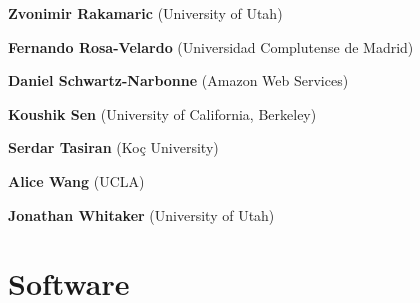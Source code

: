 \documentclass{article}
\begin{document}
\begin{commalist}
    \item {\bf Zvonimir Rakamaric} (University of Utah)


    \item {\bf Fernando Rosa-Velardo} (Universidad Complutense de Madrid)


    \item {\bf Daniel Schwartz-Narbonne} (Amazon Web Services)


    \item {\bf Koushik Sen} (University of California, Berkeley)


    \item {\bf Serdar Tasiran} (Koç University)


    \item {\bf Alice Wang} (UCLA)


    \item {\bf Jonathan Whitaker} (University of Utah)

  \end{commalist}

  \section*{Software}
\end{document}
